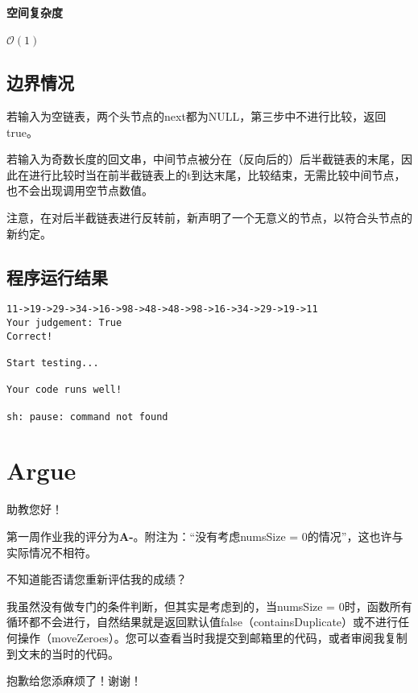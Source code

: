 \documentclass{homework}
\begin{document}
\paragraph{空间复杂度}
$\mathcal{O}(1)$
\subsection{边界情况}
若输入为空链表，两个头节点的next都为NULL，第三步中不进行比较，返回true。

若输入为奇数长度的回文串，中间节点被分在（反向后的）后半截链表的末尾，因此在进行比较时当在前半截链表上的t到达末尾，比较结束，无需比较中间节点，也不会出现调用空节点数值。

注意，在对后半截链表进行反转前，新声明了一个无意义的节点，以符合头节点的新约定。
\subsection{程序运行结果}
\begin{lstlisting}[numbers=none]
11->19->29->34->16->98->48->48->98->16->34->29->19->11  
Your judgement: True
Correct!

Start testing...

Your code runs well!

sh: pause: command not found
\end{lstlisting}
\section{Argue}
助教您好！

第一周作业我的评分为{\color{red}\bf A-}。附注为：“没有考虑numsSize = 0的情况”，这也许与实际情况不相符。

不知道能否请您重新评估我的成绩？

我虽然没有做专门的条件判断，但其实是考虑到的，当numsSize = 0时，函数所有循环都不会进行，自然结果就是返回默认值false（containsDuplicate）或不进行任何操作（moveZeroes）。您可以查看当时我提交到邮箱里的代码，或者审阅我复制到文末的当时的代码。

抱歉给您添麻烦了！谢谢！


\end{document}

